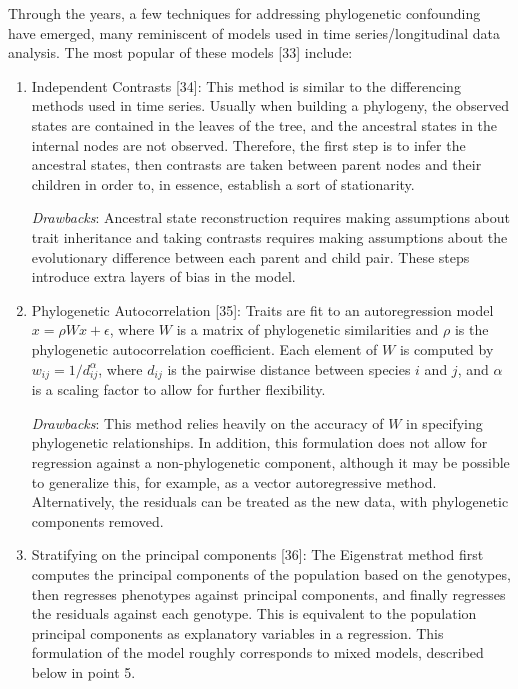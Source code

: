 \documentclass[12pt,twoside]{mitthesis-manusdown}
\begin{document}
Through the years, a few techniques for addressing phylogenetic
confounding have emerged, many reminiscent of models used in time
series/longitudinal data analysis. The most popular of these models
{[}33{]} include:
\begin{enumerate}
\def\labelenumi{\arabic{enumi}.}
\item
  Independent Contrasts {[}34{]}: This method is similar to the
  differencing methods used in time series. Usually when building a
  phylogeny, the observed states are contained in the leaves of the
  tree, and the ancestral states in the internal nodes are not observed.
  Therefore, the first step is to infer the ancestral states, then
  contrasts are taken between parent nodes and their children in order
  to, in essence, establish a sort of stationarity.

  \emph{Drawbacks}: Ancestral state reconstruction requires making
  assumptions about trait inheritance and taking contrasts requires
  making assumptions about the evolutionary difference between each
  parent and child pair. These steps introduce extra layers of bias in
  the model.
\item
  Phylogenetic Autocorrelation {[}35{]}: Traits are fit to an
  autoregression model \(x = \rho W x + \epsilon\), where \(W\) is a
  matrix of phylogenetic similarities and \(\rho\) is the phylogenetic
  autocorrelation coefficient. Each element of \(W\) is computed by
  \(w_{ij} = 1/d_{ij}^\alpha\), where \(d_{ij}\) is the pairwise
  distance between species \(i\) and \(j\), and \(\alpha\) is a scaling
  factor to allow for further flexibility.

  \emph{Drawbacks}: This method relies heavily on the accuracy of \(W\)
  in specifying phylogenetic relationships. In addition, this
  formulation does not allow for regression against a non-phylogenetic
  component, although it may be possible to generalize this, for
  example, as a vector autoregressive method. Alternatively, the
  residuals can be treated as the new data, with phylogenetic components
  removed.
\item
  Stratifying on the principal components {[}36{]}: The Eigenstrat
  method first computes the principal components of the population based
  on the genotypes, then regresses phenotypes against principal
  components, and finally regresses the residuals against each genotype.
  This is equivalent to the population principal components as
  explanatory variables in a regression. This formulation of the model
  roughly corresponds to mixed models, described below in point 5.


\end{enumerate}
\end{document}
